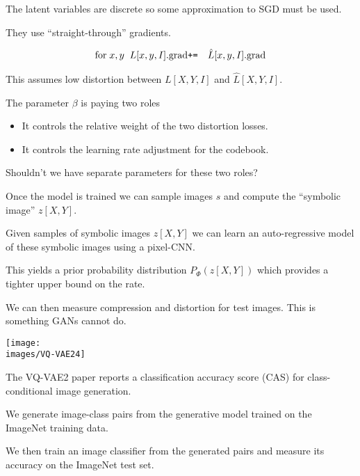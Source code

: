 {

The latent variables are discrete so some approximation to SGD must be used.

\vfill
They use ``straight-through'' gradients.

\begin{eqnarray*}
\mathrm{for}\;x,y\;\;L[x,y,I].\mathrm{grad} & \mbox{\tt +=} & \hat{L}[x,y,I].\mathrm{grad}
\end{eqnarray*}

\vfill
This assumes low distortion between $L[X,Y,I]$ and $\hat{L}[X,Y,I]$.


The parameter $\beta$ is paying two roles

\vfill
\begin{itemize}
\item It controls the relative weight of the two distortion losses.

\vfill
\item It controls the learning rate adjustment for the codebook.
\end{itemize}

\vfill
Shouldn't we have separate parameters for these two roles?


Once the model is trained we can sample images $s$ and compute the ``symbolic image'' $z[X,Y]$.

\vfill
Given samples of symbolic images $z[X,Y]$ we can learn an auto-regressive model of these symbolic images using a pixel-CNN.

\vfill
This yields a prior probability distribution $P_\Phi(z[X,Y])$ which provides a tighter upper bound on the rate.

\vfill
We can then measure compression and distortion for test images.  This is something GANs cannot do.

\centerline{\texttt{[image: \\images/VQ-VAE24]}}


The VQ-VAE2 paper reports a classification accuracy score (CAS) for class-conditional image generation.

\vfill
We generate image-class pairs from the generative model trained on the ImageNet training data.

\vfill
We then train an image classifier from the generated pairs and measure its accuracy on the ImageNet test set.

}
